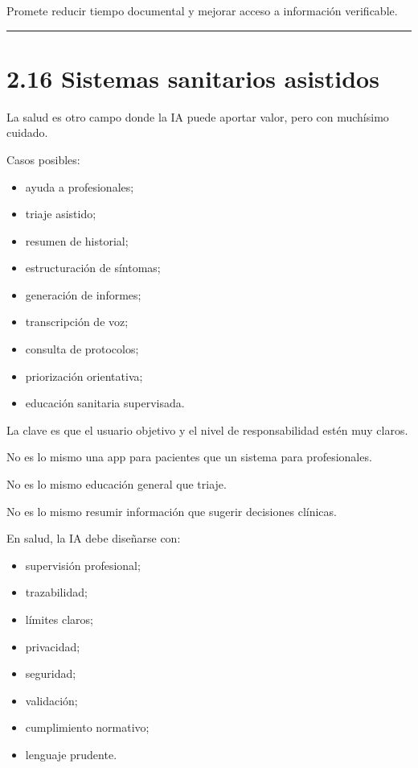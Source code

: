 Promete reducir tiempo documental y mejorar acceso a información
verificable.

\begin{center}\rule{0.5\linewidth}{0.5pt}\end{center}

\section{2.16 Sistemas sanitarios
asistidos}\label{sistemas-sanitarios-asistidos}

La salud es otro campo donde la IA puede aportar valor, pero con
muchísimo cuidado.

Casos posibles:

\begin{itemize}
\tightlist
\item
  ayuda a profesionales;
\item
  triaje asistido;
\item
  resumen de historial;
\item
  estructuración de síntomas;
\item
  generación de informes;
\item
  transcripción de voz;
\item
  consulta de protocolos;
\item
  priorización orientativa;
\item
  educación sanitaria supervisada.
\end{itemize}

La clave es que el usuario objetivo y el nivel de responsabilidad estén
muy claros.

No es lo mismo una app para pacientes que un sistema para profesionales.

No es lo mismo educación general que triaje.

No es lo mismo resumir información que sugerir decisiones clínicas.

En salud, la IA debe diseñarse con:

\begin{itemize}
\tightlist
\item
  supervisión profesional;
\item
  trazabilidad;
\item
  límites claros;
\item
  privacidad;
\item
  seguridad;
\item
  validación;
\item
  cumplimiento normativo;
\item
  lenguaje prudente.
\end{itemize}

